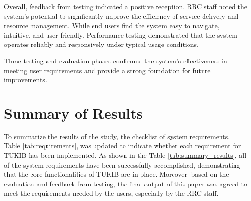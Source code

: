 Overall, feedback from testing indicated a positive reception. RRC staff noted the system’s potential to significantly improve the efficiency of service delivery and resource management. While end users find the system easy to navigate, intuitive, and user-friendly. Performance testing demonstrated that the system operates reliably and responsively under typical usage conditions.

These testing and evaluation phases confirmed the system’s effectiveness in meeting user requirements and provide a strong foundation for future improvements.

\section{Summary of Results}

To summarize the results of the study, the checklist of system requirements, Table \ref{tab:requirements}, was updated to indicate whether each requirement for TUKIB has been implemented. As shown in the Table \ref{tab:summary_results}, all of the system requirements have been successfully accomplished, demonstrating that the core functionalities of TUKIB are in place. Moreover, based on the evaluation and feedback from testing, the final output of this paper was agreed to meet the requirements needed by the users, especially by the RRC staff.

